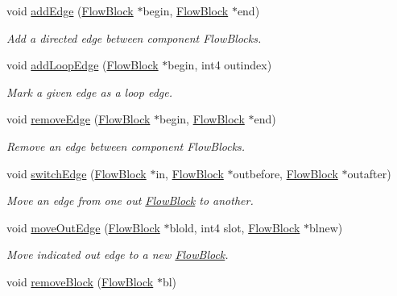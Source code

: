 \begin{DoxyCompactItemize}
void \mbox{\hyperlink{class_block_graph_a0bd135694f8274979c03d005d796d81f}{add\+Edge}} (\mbox{\hyperlink{class_flow_block}{Flow\+Block}} $\ast$begin, \mbox{\hyperlink{class_flow_block}{Flow\+Block}} $\ast$end)
\begin{DoxyCompactList}\small\item\em Add a directed edge between component Flow\+Blocks. \end{DoxyCompactList}\item 
void \mbox{\hyperlink{class_block_graph_af4f0c927ad7c32721de2474b6180cb48}{add\+Loop\+Edge}} (\mbox{\hyperlink{class_flow_block}{Flow\+Block}} $\ast$begin, int4 outindex)
\begin{DoxyCompactList}\small\item\em Mark a given edge as a {\itshape loop} edge. \end{DoxyCompactList}\item 
void \mbox{\hyperlink{class_block_graph_a2fe87e9f6a5a250a09869028bf1bb11d}{remove\+Edge}} (\mbox{\hyperlink{class_flow_block}{Flow\+Block}} $\ast$begin, \mbox{\hyperlink{class_flow_block}{Flow\+Block}} $\ast$end)
\begin{DoxyCompactList}\small\item\em Remove an edge between component Flow\+Blocks. \end{DoxyCompactList}\item 
void \mbox{\hyperlink{class_block_graph_a238a3ecac594008e2893b2fa1f85d95b}{switch\+Edge}} (\mbox{\hyperlink{class_flow_block}{Flow\+Block}} $\ast$in, \mbox{\hyperlink{class_flow_block}{Flow\+Block}} $\ast$outbefore, \mbox{\hyperlink{class_flow_block}{Flow\+Block}} $\ast$outafter)
\begin{DoxyCompactList}\small\item\em Move an edge from one out \mbox{\hyperlink{class_flow_block}{Flow\+Block}} to another. \end{DoxyCompactList}\item 
void \mbox{\hyperlink{class_block_graph_a4a1dcf88374cbf4b9886d26dced7c533}{move\+Out\+Edge}} (\mbox{\hyperlink{class_flow_block}{Flow\+Block}} $\ast$blold, int4 slot, \mbox{\hyperlink{class_flow_block}{Flow\+Block}} $\ast$blnew)
\begin{DoxyCompactList}\small\item\em Move indicated {\itshape out} edge to a new \mbox{\hyperlink{class_flow_block}{Flow\+Block}}. \end{DoxyCompactList}\item 
void \mbox{\hyperlink{class_block_graph_a566cbe393f781703c640a691e27a4f90}{remove\+Block}} (\mbox{\hyperlink{class_flow_block}{Flow\+Block}} $\ast$bl)

\end{DoxyCompactItemize}
